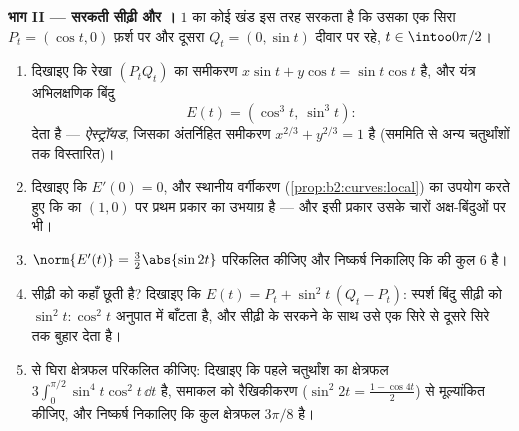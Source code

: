 \begin{problem}[{सप्ताहांत समस्या --- अन्वालोप यंत्र और
चार शास्त्रीय वक्र}]
\medskip
\noindent\textbf{भाग II --- सरकती सीढ़ी और
।}  $1$ का कोई खंड इस तरह सरकता है कि उसका एक
सिरा $P_t =
(\cos t, 0)$ फ़र्श पर और दूसरा $Q_t = (0, \sin t)$ दीवार पर
रहे, $t \in \intoo0{\pi/2}$।
\begin{enumerate}[resume]
  \item दिखाइए कि रेखा $(P_tQ_t)$ का समीकरण $x\sin t +
        y\cos t = \sin t\cos t$ है, और  यंत्र अभिलक्षणिक बिंदु
        \[
        E(t) = (\cos^3 t,\ \sin^3 t) :
        \]
        देता है --- \emph{ऐस्ट्रॉयड}, जिसका
        अंतर्निहित समीकरण $x^{2/3} + y^{2/3} = 1$ है (सममिति से
        अन्य चतुर्थांशों तक विस्तारित)।
  \item दिखाइए कि $E'(0) = 0$, और स्थानीय
        वर्गीकरण (\cref{prop:b2:curves:local}) का उपयोग करते हुए कि
         का $(1, 0)$ पर प्रथम प्रकार का उभयाग्र है
        --- और इसी प्रकार उसके चारों अक्ष-बिंदुओं पर भी।
  \item $\norm{E'(t)} = \tfrac32\abs{\sin 2t}$ परिकलित कीजिए और
        निष्कर्ष निकालिए कि  की कुल  $6$ है।
  \item सीढ़ी  को कहाँ छूती है? दिखाइए कि $E(t) =
        P_t + \sin^2 t\,(Q_t - P_t)$: स्पर्श बिंदु
        सीढ़ी को $\sin^2 t : \cos^2
        t$ अनुपात में बाँटता है, और सीढ़ी के सरकने के साथ
        उसे एक सिरे से दूसरे सिरे तक बुहार देता है।
  \item {} से घिरा क्षेत्रफल परिकलित कीजिए: दिखाइए कि
        पहले चतुर्थांश का क्षेत्रफल $3\int_0^{\pi/2}\sin^4
        t\cos^2 t\,\dd t$ है, समाकल को
        रैखिकीकरण ($\sin^2 2t = \tfrac{1 - \cos 4t}2$) से मूल्यांकित कीजिए,
        और निष्कर्ष निकालिए कि कुल क्षेत्रफल $3\pi/8$ है।
\end{enumerate}


\end{problem}
